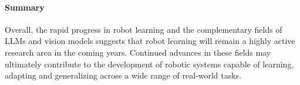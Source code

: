 \paragraph{Summary}
Overall, the rapid progress in robot learning and the complementary fields of \acp{LLM} and vision models suggests that robot learning will remain a highly active research area in the coming years. Continued advances in these fields may ultimately contribute to the development of robotic systems capable of learning, adapting and generalizing across a wide range of real-world tasks.































